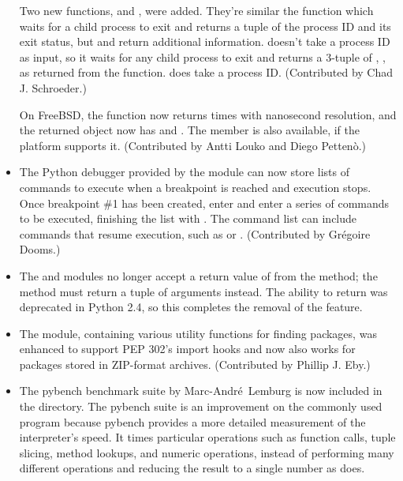 \documentclass{howto}
\begin{document}
\begin{itemize}
Two new functions,  and , were
added.  They're similar the  function which waits
for a child process to exit and returns a tuple of the process ID and
its exit status, but  and  return
additional information.   doesn't take a process ID
as input, so it waits for any child process to exit and returns a
3-tuple of , , 
as returned from the  function.
 does take a process ID.
(Contributed by Chad J. Schroeder.)

On FreeBSD, the  function now returns 
times with nanosecond resolution, and the returned object
now has  and .
The  member is also available, if the platform supports it.
(Contributed by Antti Louko and  Diego Petten\`o.)

\item The Python debugger provided by the  module
can now store lists of commands to execute when a breakpoint is
reached and execution stops.  Once breakpoint \#1 has been created,
enter  and enter a series of commands to be executed,
finishing the list with .  The command list can include
commands that resume execution, such as  or
.  (Contributed by Gr\'egoire Dooms.)

\item The  and  modules no
longer accept a return value of  from the
 method; the method must return a tuple of
arguments instead.  The ability to return  was deprecated
in Python 2.4, so this completes the removal of the feature.

\item The  module, containing various utility
functions for finding packages, was enhanced to support PEP 302's
import hooks and now also works for packages stored in ZIP-format archives.
(Contributed by Phillip J. Eby.)

\item The pybench benchmark suite by Marc-Andr\'e~Lemburg is now
included in the  directory.  The pybench suite is
an improvement on the commonly used  program because
pybench provides a more detailed measurement of the interpreter's
speed.  It times particular operations such as function calls,
tuple slicing, method lookups, and numeric operations, instead of
performing many different operations and reducing the result to a
single number as  does.


\end{itemize}
\end{document}
